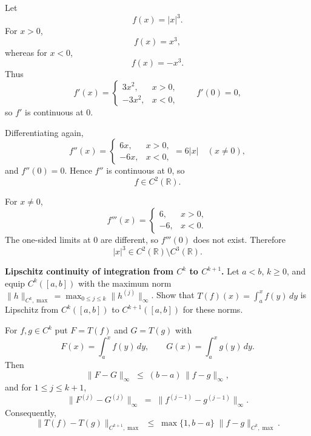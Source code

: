 \begin{solution}
Let
\[
f(x)=|x|^3.
\]
For \(x>0\),
\[
f(x)=x^3,
\]
whereas for \(x<0\),
\[
f(x)=-x^3.
\]
Thus
\[
f'(x)=
\begin{cases}
3x^2,&x>0,\\
-3x^2,&x<0,
\end{cases}
\qquad
f'(0)=0,
\]
so \(f'\) is continuous at \(0\).

Differentiating again,
\[
f''(x)=
\begin{cases}
6x,&x>0,\\
-6x,&x<0,
\end{cases}
=
6|x|
\quad(x\neq0),
\]
and \(f''(0)=0\). Hence \(f''\) is continuous at \(0\), so
\[
f\in C^2(\mathbb R).
\]

For \(x\neq0\),
\[
f'''(x)=
\begin{cases}
6,&x>0,\\
-6,&x<0.
\end{cases}
\]
The one-sided limits at \(0\) are different, so \(f'''(0)\) does not exist. Therefore
\[
\boxed{|x|^3\in C^2(\mathbb R)\setminus C^3(\mathbb R).}
\]
\end{solution}


\begin{problem}[CP-IV-0100]
\label{prob:cp-iv-0100}
\textbf{Lipschitz continuity of integration from $C^k$ to $C^{k+1}$.}
Let $a<b$, $k\ge0$, and equip $C^k([a,b])$ with the maximum norm
$\|h\|_{C^k,\max}=\max_{0\le j\le k}\|h^{(j)}\|_\infty$.
Show that $T(f)(x)=\int_a^x f(y)\,dy$ is Lipschitz from
$C^k([a,b])$ to $C^{k+1}([a,b])$ for these norms.

	For $f,g\in C^k$ put $F=T(f)$ and $G=T(g)$ with
	\[
	F(x)=\int_a^x f(y)\,dy, \qquad G(x)=\int_a^x g(y)\,dy .
	\]
	Then
	\[
	\|F-G\|_\infty \;\le\; (b-a)\,\|f-g\|_\infty,
	\]
	and for $1\le j\le k+1$,
	\[
	\|F^{(j)}-G^{(j)}\|_\infty \;=\; \|f^{(j-1)}-g^{(j-1)}\|_\infty .
	\]
	Consequently,
	\[
	\|T(f)-T(g)\|_{C^{k+1},\max}
	\;\le\; \max\{1,b-a\}\; \|f-g\|_{C^k,\max}.
	\]

	\medskip
\end{problem}

